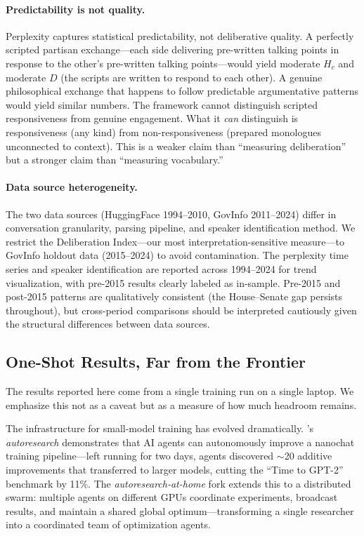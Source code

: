 \documentclass[12pt]{article}
\newcommand{\Hc}{H_c}
\newcommand{\DI}{\mathit{D}}
\begin{document}
\paragraph{Predictability is not quality.} Perplexity captures statistical predictability, not deliberative quality. A perfectly scripted partisan exchange---each side delivering pre-written talking points in response to the other's pre-written talking points---would yield moderate $\Hc$ and moderate $\DI$ (the scripts are written to respond to each other). A genuine philosophical exchange that happens to follow predictable argumentative patterns would yield similar numbers. The framework cannot distinguish scripted responsiveness from genuine engagement. What it \textit{can} distinguish is responsiveness (any kind) from non-responsiveness (prepared monologues unconnected to context). This is a weaker claim than ``measuring deliberation'' but a stronger claim than ``measuring vocabulary.''

\paragraph{Data source heterogeneity.} The two data sources (HuggingFace 1994--2010, GovInfo 2011--2024) differ in conversation granularity, parsing pipeline, and speaker identification method. We restrict the Deliberation Index---our most interpretation-sensitive measure---to GovInfo holdout data (2015--2024) to avoid contamination. The perplexity time series and speaker identification are reported across 1994--2024 for trend visualization, with pre-2015 results clearly labeled as in-sample. Pre-2015 and post-2015 patterns are qualitatively consistent (the House--Senate gap persists throughout), but cross-period comparisons should be interpreted cautiously given the structural differences between data sources.

\subsection{One-Shot Results, Far from the Frontier}

The results reported here come from a single training run on a single laptop. We emphasize this not as a caveat but as a measure of how much headroom remains.

The infrastructure for small-model training has evolved dramatically. \citeauthor{karpathy2026}'s \textit{autoresearch} \citeyearpar{karpathy2026} demonstrates that AI agents can autonomously improve a nanochat training pipeline---left running for two days, agents discovered $\sim$20 additive improvements that transferred to larger models, cutting the ``Time to GPT-2'' benchmark by 11\%. The \textit{autoresearch-at-home} fork \citep{autoresearchAtHome2026} extends this to a distributed swarm: multiple agents on different GPUs coordinate experiments, broadcast results, and maintain a shared global optimum---transforming a single researcher into a coordinated team of optimization agents.
\end{document}
